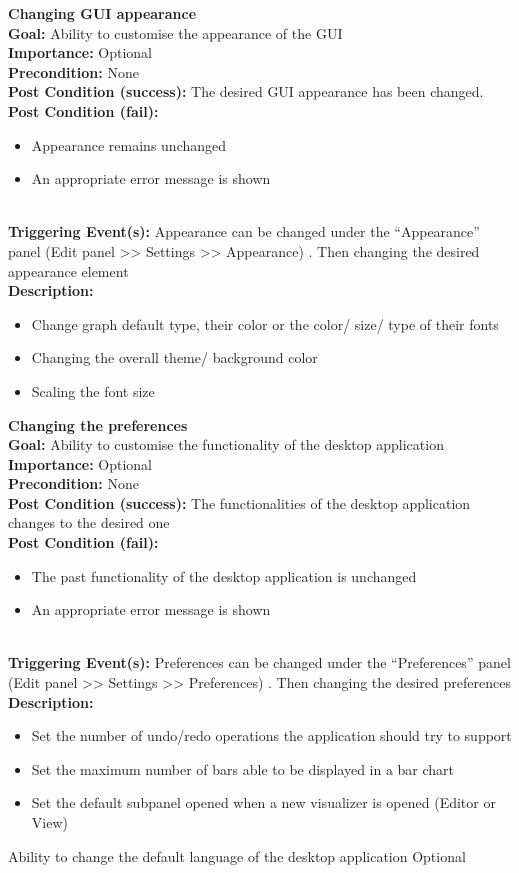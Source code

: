 \documentclass[10pt,a4paper]{report}
\newcommand{\precondition}[1]{
    \textbf{Precondition: } #1 \leavevmode \\
}
\newcommand{\FRODescription}[8]{
    \textbf{#1} \leavevmode \\
    \textbf{Goal: } #2 \leavevmode \\
    \textbf{Importance: } #3 \leavevmode \\
    \precondition{#4}
    \textbf{Post Condition (success): } #5 \leavevmode \\
    \textbf{Post Condition (fail): } #6 \leavevmode \\
    \textbf{Triggering Event(s): } #7 \leavevmode \\
    \textbf{Description: } \leavevmode \\
    #8}
\begin{document}
\begin{FRO}
    \item \FRODescription{Changing GUI appearance\label{FRO-17}}
    {Ability to customise the appearance of the GUI}
    {Optional}
    {None}
    {The desired GUI appearance has been changed.}
    {\begin{itemize}
        \item Appearance remains unchanged
        \item An appropriate error message is shown
    \end{itemize}}
    {Appearance can be changed under the “Appearance” panel (Edit panel >> Settings >> Appearance) . Then changing the desired appearance element}
    {\begin{itemize}
        \item Change graph default type, their color or the color/ size/ type of their fonts
        \item Changing the overall theme/ background color
        \item Scaling the font size
    \end{itemize}}
    \item \FRODescription{Changing the preferences\label{FRO-18}}
    {Ability to customise the functionality of the desktop application}
    {Optional}
    {None}
    {The functionalities of the desktop application changes to the desired one}
    {\begin{itemize}
        \item The past functionality of the desktop application is unchanged
        \item An appropriate error message is shown
    \end{itemize}}
    {Preferences can be changed under the “Preferences” panel (Edit panel >> Settings >> Preferences) . Then changing the desired preferences}
    {\begin{itemize}
        \item Set the number of undo/redo operations the application should try to support
        \item Set the maximum number of bars able to be displayed in a bar chart
        \item Set the default subpanel opened when a new visualizer is opened (Editor or View)
    \end{itemize}}
    \item {}
    {Ability to change the default language of the desktop application}
    {Optional}

\end{FRO}
\end{document}
